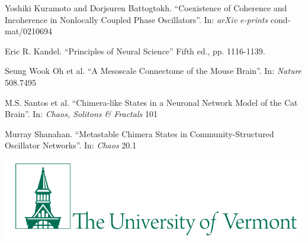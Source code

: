 \documentclass{beamer}
\begin{document}
\begin{frame}[t]
\begin{multicols}{3}
\begin{thebibliography}{99}
     Yoshiki Kuramoto and Dorjsuren Battogtokh. ``Coexistence of Coherence and Incoherence in Nonlocally Coupled Phase Oscillators''.
      In: \textit{arXiv e-prints} cond-mat/0210694

     Eric R. Kandel. ``Principles of Neural Science'' Fifth ed., pp. 1116-1139.

     Seung Wook Oh et al. ``A Mesoscale Connectome of the Mouse Brain''.
      In: \textit{Nature} 508.7495

     M.S. Santos et al. ``Chimera-like States in a Neuronal Network Model of the Cat Brain''.
      In: \textit{Chaos, Solitons \& Fractals} 101

     Murray Shanahan. ``Metastable Chimera States in Community-Structured Oscillator Networks''.
      In: \textit{Chaos} 20.1

    \end{thebibliography}

    \includegraphics[width=\columnwidth]{figure/UVM}
  \end{multicols}

\end{frame}
\end{document}
